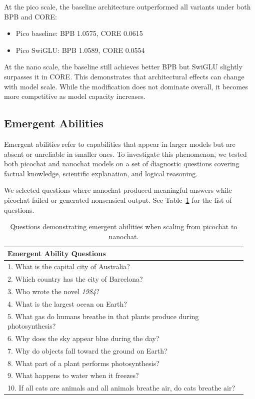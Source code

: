 At the pico scale, the baseline architecture outperformed all variants
under both BPB and CORE:

\begin{itemize}
\item Pico baseline: BPB 1.0575, CORE 0.0615
\item Pico SwiGLU: BPB 1.0589, CORE 0.0554
\end{itemize}

At the nano scale, the baseline still achieves better BPB but SwiGLU
slightly surpasses it in CORE. This demonstrates that architectural
effects can change with model scale. While the modification does not
dominate overall, it becomes more competitive as model capacity
increases.

\subsection{Emergent Abilities}

Emergent abilities refer to capabilities that appear in larger models
but are absent or unreliable in smaller ones. To investigate this
phenomenon, we tested both picochat and nanochat models on a set of
diagnostic questions covering factual knowledge, scientific explanation,
and logical reasoning.

We selected questions where nanochat produced meaningful answers while
picochat failed or generated nonsensical output. See Table~\ref{tab:emergent_questions} for the list of questions.

\begin{table}[H]
\centering
\small
\begin{tabular}{p{0.95\linewidth}}
\hline
\textbf{Emergent Ability Questions} \\
\hline
1. What is the capital city of Australia? \\
2. Which country has the city of Barcelona? \\
3. Who wrote the novel \textit{1984}? \\
4. What is the largest ocean on Earth? \\
5. What gas do humans breathe in that plants produce during photosynthesis? \\
6. Why does the sky appear blue during the day? \\
7. Why do objects fall toward the ground on Earth? \\
8. What part of a plant performs photosynthesis? \\
9. What happens to water when it freezes? \\
10. If all cats are animals and all animals breathe air, do cats breathe air? \\
\hline
\end{tabular}
\caption{Questions demonstrating emergent abilities when scaling from
picochat to nanochat.}
\label{tab:emergent_questions}
\end{table}


